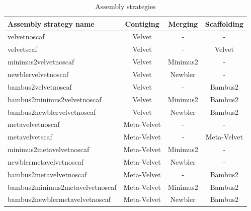 \documentclass[a4paper,12pt]{article}
\begin{document}
\begin{table}[h!]
\centering
\begin{tabular}{|l|c|c|c|}
\hline
Assembly strategy name & Contiging & Merging & Scaffolding\\
\hline
velvetnoscaf & Velvet & - & -\\
velvetscaf & Velvet & - & Velvet\\
minimus2velvetnoscaf & Velvet & Minimus2 & -\\
newblervelvetnoscaf & Velvet & Newbler & -\\
bambus2velvetnoscaf & Velvet & - & Bambus2\\
bambus2minimus2velvetnoscaf & Velvet & Minimus2 & Bambus2\\
bambus2newblervelvetnoscaf & Velvet & Newbler & Bambus2\\
metavelvetnoscaf & Meta-Velvet & - & -\\
metavelvetscaf & Meta-Velvet & - & Meta-Velvet\\
minimus2metavelvetnoscaf & Meta-Velvet & Minimus2 & -\\
newblermetavelvetnoscaf & Meta-Velvet & Newbler & -\\
bambus2metavelvetnoscaf & Meta-Velvet & - & Bambus2\\
bambus2minimus2metavelvetnoscaf & Meta-Velvet & Minimus2 & Bambus2\\
bambus2newblermetavelvetnoscaf & Meta-Velvet & Newbler & Bambus2\\
\hline
\end{tabular}
\caption{Assembly strategies}
\label{tab:asmstrat}
\end{table}
\end{document}
